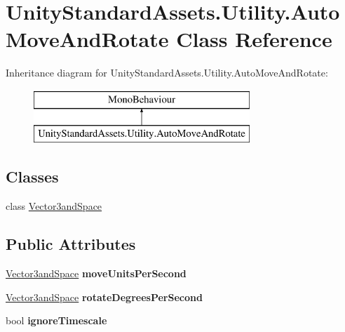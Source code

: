 \hypertarget{class_unity_standard_assets_1_1_utility_1_1_auto_move_and_rotate}{}\section{Unity\+Standard\+Assets.\+Utility.\+Auto\+Move\+And\+Rotate Class Reference}
\label{class_unity_standard_assets_1_1_utility_1_1_auto_move_and_rotate}
Inheritance diagram for Unity\+Standard\+Assets.\+Utility.\+Auto\+Move\+And\+Rotate\+:\begin{figure}[H]
\begin{center}
\leavevmode
\includegraphics[height=2.000000cm]{class_unity_standard_assets_1_1_utility_1_1_auto_move_and_rotate}
\end{center}
\end{figure}
\subsection*{Classes}
\begin{DoxyCompactItemize}
\item 
class \hyperlink{class_unity_standard_assets_1_1_utility_1_1_auto_move_and_rotate_1_1_vector3and_space}{Vector3and\+Space}
\end{DoxyCompactItemize}
\subsection*{Public Attributes}
\begin{DoxyCompactItemize}
\item 
\mbox{\label{class_unity_standard_assets_1_1_utility_1_1_auto_move_and_rotate_ac1c663ec1f1d0f5f3659506a9738bd32}} 
\hyperlink{class_unity_standard_assets_1_1_utility_1_1_auto_move_and_rotate_1_1_vector3and_space}{Vector3and\+Space} {\bfseries move\+Units\+Per\+Second}
\item 
\mbox{\label{class_unity_standard_assets_1_1_utility_1_1_auto_move_and_rotate_a44e784fd8e9253c3ae420024be95b0e2}} 
\hyperlink{class_unity_standard_assets_1_1_utility_1_1_auto_move_and_rotate_1_1_vector3and_space}{Vector3and\+Space} {\bfseries rotate\+Degrees\+Per\+Second}
\item 
\mbox{\label{class_unity_standard_assets_1_1_utility_1_1_auto_move_and_rotate_a976e08503afdbe2ecc8167b224bc63de}} 
bool {\bfseries ignore\+Timescale}
\end{DoxyCompactItemize}

